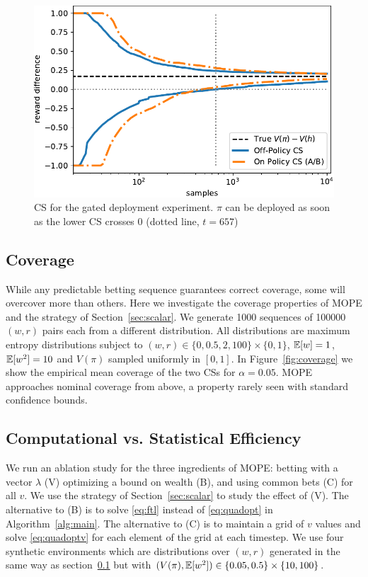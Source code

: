 \begin{figure}
    \centering
    \includegraphics[width=0.75\linewidth]{gd2}
    \caption{CS for the gated deployment experiment. $\pi$ can be 
    deployed as soon as the lower CS crosses 0 (dotted line, $t=657$)}
    \label{fig:gd}
\end{figure}

\subsection{Coverage} \label{sec:coverage}
While any predictable betting sequence
guarantees correct coverage, some will overcover more than
others. Here we investigate the coverage properties of
MOPE and the strategy of Section~\ref{sec:scalar}.
We generate 1000 sequences of 100000 $(w,r)$ pairs each from a different
distribution. All distributions are maximum entropy distributions subject to
$(w,r) \in \{0, 0.5, 2, 100\} \times \{0,1\}$, $\mathbb{E}[w]=1$, $\mathbb{E}[w^2]=10$
and $V(\pi)$ sampled uniformly in $[0,1]$. In Figure~\ref{fig:coverage} we show
the empirical mean coverage of the two CSs for $\alpha=0.05$. 
MOPE approaches nominal coverage from above,
a property rarely seen with standard confidence bounds.

\subsection{Computational vs. Statistical Efficiency}
We run an ablation study for the three ingredients of MOPE:
betting with a vector $\lambda$ (V)
optimizing a bound on wealth (B), 
and using common bets (C) for all $v$. We use 
the strategy of Section~\ref{sec:scalar} to study
the effect of (V). The alternative to (B) is to 
solve \eqref{eq:ftl} instead of \eqref{eq:quadopt} in
Algorithm~\ref{alg:main}.
The alternative to (C) is to maintain a 
grid of $v$ values and solve
\eqref{eq:quadoptv} for each element of the grid
at each timestep. We use four synthetic environments
which are distributions over $(w,r)$ generated in the same way as section~\ref{sec:coverage} but
with $(V(\pi),\mathbb{E}[w^2]) \in \{0.05, 0.5\} \times \{10, 100\}$.


